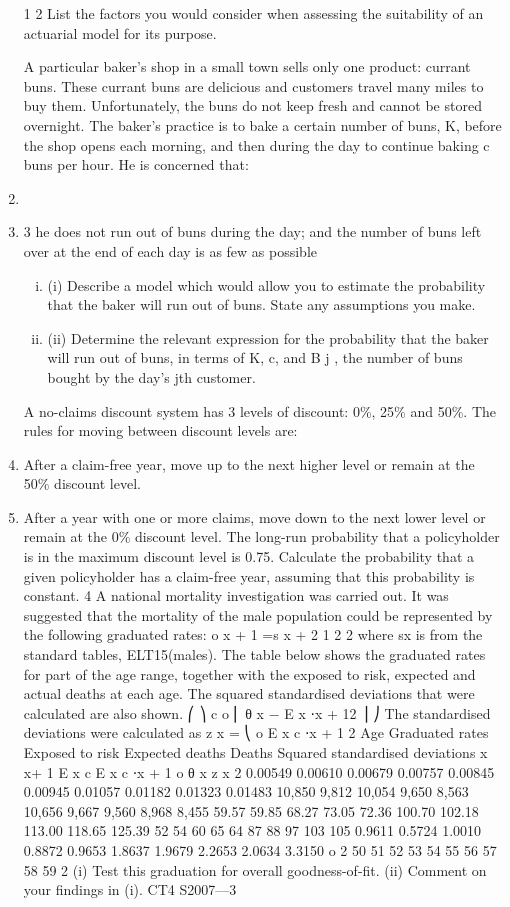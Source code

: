 \documentclass[a4paper,12pt]{article}
\begin{document}
\begin{enumerate}
1
2
List the factors you would consider when assessing the suitability of an actuarial
model for its purpose.

A particular baker’s shop in a small town sells only one product: currant buns. These
currant buns are delicious and customers travel many miles to buy them.
Unfortunately, the buns do not keep fresh and cannot be stored overnight.
The baker’s practice is to bake a certain number of buns, K, before the shop opens
each morning, and then during the day to continue baking c buns per hour. He is
concerned that:
\item
\item
3
he does not run out of buns during the day; and
the number of buns left over at the end of each day is as few as possible
\begin{enumerate}[(i)]
\item (i) Describe a model which would allow you to estimate the probability that the baker will run out of buns. State any assumptions you make.
\item 
(ii) Determine the relevant expression for the probability that the baker will run out of buns, in terms of K, c, and B j , the number of buns bought by the day’s jth customer.
\end{enumerate}

A no-claims discount system has 3 levels of discount: 0\%, 25\% and 50\%. The rules for moving between discount levels are:
\item After a claim-free year, move up to the next higher level or remain at the 50\% discount level.
\item After a year with one or more claims, move down to the next lower level or remain at the 0\% discount level.
The long-run probability that a policyholder is in the maximum discount level is 0.75. Calculate the probability that a given policyholder has a claim-free year, assuming that this probability is constant.
4
A national mortality investigation was carried out. It was suggested that the mortality of the male population could be represented by the following graduated rates:
o
\mu x + 1 =\mu s x + 2 1
2
2
where \mu sx is from the standard tables, ELT15(males).
The table below shows the graduated rates for part of the age range, together with the exposed to risk, expected and actual deaths at each age. The squared standardised
deviations that were calculated are also shown.
⎛
⎞
c o
⎜ θ x − E x ⋅\mu x + 12 ⎟
⎠
The standardised deviations were calculated as z x = ⎝
o
E x c ⋅\mu x + 1
2
Age Graduated
rates
Exposed
to risk Expected
deaths Deaths Squared
standardised
deviations
x \mu x+ 1 E x c E x c ⋅\mu x + 1 o θ x z x 2
0.00549
0.00610
0.00679
0.00757
0.00845
0.00945
0.01057
0.01182
0.01323
0.01483 10,850
9,812
10,054
9,650
8,563
10,656
9,667
9,560
8,968
8,455 59.57
59.85
68.27
73.05
72.36
100.70
102.18
113.00
118.65
125.39 52
54
60
65
64
87
88
97
103
105 0.9611
0.5724
1.0010
0.8872
0.9653
1.8637
1.9679
2.2653
2.0634
3.3150
o
2
50
51
52
53
54
55
56
57
58
59
2
(i) Test this graduation for overall goodness-of-fit.
(ii) Comment on your findings in (i).
CT4 S2007—3



\end{enumerate}
\end{document}
